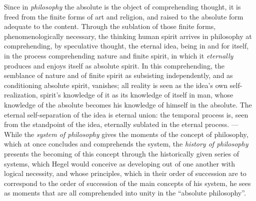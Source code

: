 Since in \emph{philosophy} the absolute is the object of comprehending
thought, it is freed from the finite forms of art and religion, and
raised to the absolute form adequate to the content. Through the
sublation of those finite forms, phenomenologically necessary, the
thinking human spirit arrives in philosophy at comprehending, by
speculative thought, the eternal idea, being in and for itself, in the
process comprehending nature and finite spirit, in which it
\emph{eternally} produces and enjoys itself as absolute spirit. In this
comprehending, the semblance of nature and of finite spirit as
subsisting independently, and as conditioning absolute spirit, vanishes;
all reality is seen as the idea's own self-realization, spirit's
knowledge of it as its knowledge of itself in man, whose knowledge of the
absolute becomes his knowledge of himself in the absolute. The eternal
self-separation of the idea is eternal union: the temporal process is,
seen from the standpoint of the idea, eternally sublated in the eternal
process. --- While the \emph{system of philosophy} gives the moments of
the concept of philosophy, which at once concludes and
comprehends the system, the \emph{history of philosophy} presents the
becoming of this concept through the historically given series of
systems, which Hegel would conceive as developing out of one another
with logical necessity, and whose principles, which in their order of
succession are to correspond to the order of succession of the main
concepts of his system, he sees as moments that are all comprehended
into unity in the ``absolute philosophy''.

\divrule

